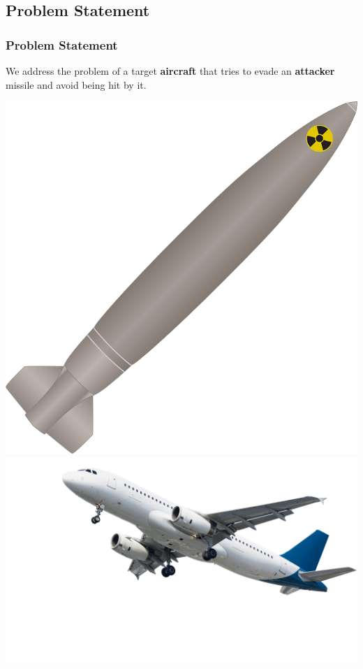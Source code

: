 \documentclass{beamer}
\begin{document}
\subsection{Problem Statement} 
\begin{frame}
\frametitle{Problem Statement}
We address the problem of a target \textbf{aircraft} that tries to evade an \textbf{attacker} missile and avoid being hit by it.\bigskip

\centering\includegraphics[height=0.25\textheight]{fig/m}  \quad
\centering\includegraphics[height=0.45\textheight]{fig/t} 

\end{frame}
\end{document}
